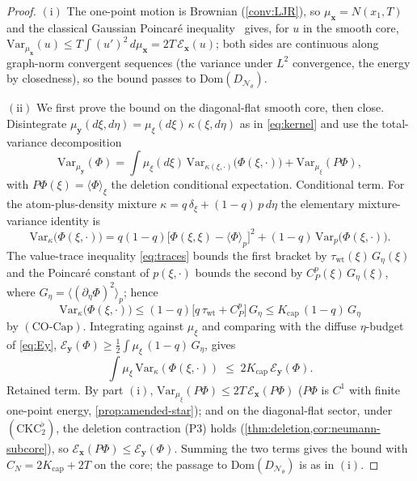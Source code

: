 \documentclass[reqno,final,11pt]{amsart}
\theoremstyle{plain}
\theoremstyle{definition}
\theoremstyle{remark}
\newcommand{\Dom}{\mathrm{Dom}}
\newcommand{\cE}{\mathcal E}
\newcommand{\cN}{\mathcal N}
\newcommand{\DN}{D_{\cN_\theta}}
\newcommand{\COcap}{(\mathrm{CO\text{-}Cap})}
\begin{document}
\begin{proof}
$(\mathrm i)$ The one-point motion is Brownian (\cref{conv:LJR}), so
$\mu_{\mathbf x}=N(x_1,T)$ and the classical Gaussian Poincar\'e
inequality~\citep{Bogachev} gives, for $u$ in the smooth core,
$\mathrm{Var}_{\mu_{\mathbf x}}(u)\le T\int(u')^2\,d\mu_{\mathbf x}
=2T\,\cE_{\mathbf x}(u)$; both sides are continuous along graph-norm convergent
sequences (the variance under $L^2$ convergence, the energy by closedness), so
the bound passes to $\Dom(\DN)$.

$(\mathrm{ii})$ We first prove the bound on the diagonal-flat smooth core, then
close. Disintegrate $\mu_{\mathbf y}(d\xi,d\eta)=\mu_\xi(d\xi)\,\kappa(\xi,d\eta)$
as in \eqref{eq:kernel} and use the total-variance decomposition
\[
  \mathrm{Var}_{\mu_{\mathbf y}}(\Phi)
  =\int\mu_\xi(d\xi)\,\mathrm{Var}_{\kappa(\xi,\cdot)}\bigl(\Phi(\xi,\cdot)\bigr)
   +\mathrm{Var}_{\mu_\xi}(P\Phi),
\]
with $P\Phi(\xi)=\langle\Phi\rangle_\xi$ the deletion conditional expectation.
Conditional term. For the atom-plus-density mixture
$\kappa=q\,\delta_\xi+(1-q)\,p\,d\eta$ the elementary mixture-variance identity is
\[
  \mathrm{Var}_{\kappa}\bigl(\Phi(\xi,\cdot)\bigr)
  =q(1-q)\bigl[\Phi(\xi,\xi)-\langle\Phi\rangle_p\bigr]^2
   +(1-q)\,\mathrm{Var}_{p}\bigl(\Phi(\xi,\cdot)\bigr).
\]
The value-trace inequality \eqref{eq:traces} bounds the first bracket by
$\tau_{\mathrm{wt}}(\xi)\,G_\eta(\xi)$ and the Poincar\'e constant of
$p(\xi,\cdot)$ bounds the second by $C^p_P(\xi)\,G_\eta(\xi)$, where
$G_\eta=\langle(\partial_\eta\Phi)^2\rangle_p$; hence
\[
  \mathrm{Var}_{\kappa}\bigl(\Phi(\xi,\cdot)\bigr)
  \le(1-q)\bigl[q\,\tau_{\mathrm{wt}}+C^p_P\bigr]\,G_\eta
  \le K_{\mathrm{cap}}\,(1-q)\,G_\eta
\]
by $\COcap$. Integrating against $\mu_\xi$ and comparing with the diffuse
$\eta$-budget of \eqref{eq:Ey},
$\cE_{\mathbf y}(\Phi)\ge\tfrac12\int\mu_\xi\,(1-q)\,G_\eta$, gives
\[
  \int\mu_\xi\,\mathrm{Var}_{\kappa}(\Phi(\xi,\cdot))
  \;\le\;2K_{\mathrm{cap}}\,\cE_{\mathbf y}(\Phi).
\]
Retained term. By part $(\mathrm i)$,
$\mathrm{Var}_{\mu_\xi}(P\Phi)\le2T\,\cE_{\mathbf x}(P\Phi)$ ($P\Phi$ is $C^1$
with finite one-point energy, \cref{prop:amended-star}); and on the diagonal-flat
sector, under $(\mathrm{CKC}_2^{\flat})$, the deletion contraction
\textnormal{(P3)} holds (\cref{thm:deletion,cor:neumann-subcore}), so
$\cE_{\mathbf x}(P\Phi)\le\cE_{\mathbf y}(\Phi)$. Summing the two terms gives the
bound with $C_N=2K_{\mathrm{cap}}+2T$ on the core; the passage to $\Dom(\DN)$ is
as in $(\mathrm i)$.
\end{proof}
\end{document}
